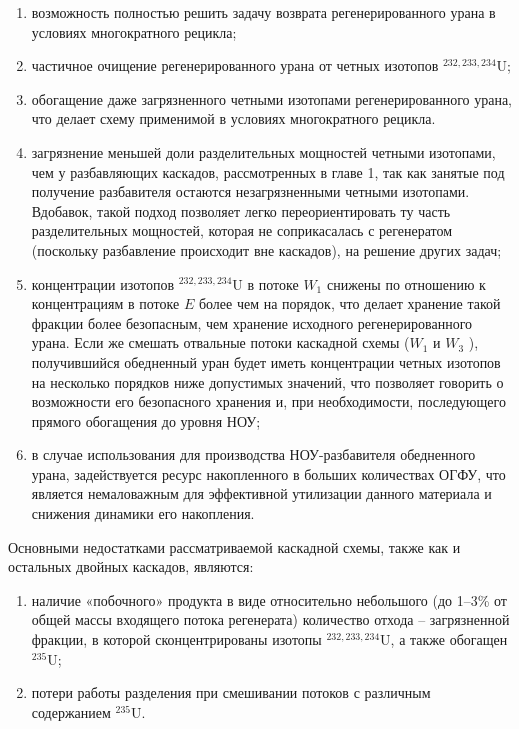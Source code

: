 \begin{enumerate}
    \item возможность полностью решить задачу возврата регенерированного урана в условиях многократного рецикла;
    \item частичное очищение регенерированного урана от четных изотопов $^{232,233,234}$U;
    \item обогащение даже загрязненного четными изотопами регенерированного урана, что делает схему применимой в условиях многократного рецикла.
    \item загрязнение меньшей доли разделительных мощностей четными изотопами, чем у разбавляющих каскадов, рассмотренных в главе 1, так как занятые под получение разбавителя остаются незагрязненными четными изотопами. Вдобавок, такой подход позволяет легко переориентировать ту часть разделительных мощностей, которая не соприкасалась с регенератом (поскольку разбавление происходит вне каскадов), на решение других задач;
    \item концентрации изотопов $^{232,233,234}$U в потоке $W_1$ снижены по отношению к концентрациям в потоке $E$ более чем на порядок, что делает хранение такой фракции более безопасным, чем хранение исходного регенерированного урана. Если же смешать отвальные потоки каскадной схемы ($W_1$  и $W_3$ ), получившийся обедненный уран будет иметь концентрации четных изотопов на несколько порядков ниже допустимых значений, что позволяет говорить о возможности его безопасного хранения и, при необходимости, последующего прямого обогащения до уровня НОУ;
    \item в случае использования для производства НОУ-разбавителя обедненного урана, задействуется ресурс накопленного в больших количествах ОГФУ, что является немаловажным для эффективной утилизации данного материала и снижения динамики его накопления.
\end{enumerate}

Основными недостатками рассматриваемой каскадной схемы, также как и остальных двойных каскадов, являются: 
\begin{enumerate}
    \item наличие «побочного» продукта в виде относительно небольшого (до 1–3\% от общей массы входящего потока регенерата) количество отхода -- загрязненной фракции, в которой сконцентрированы изотопы $^{232,233,234}$U, а также обогащен $^{235}$U;
    \item потери работы разделения при смешивании потоков с различным содержанием  $^{235}$U.
\end{enumerate}


